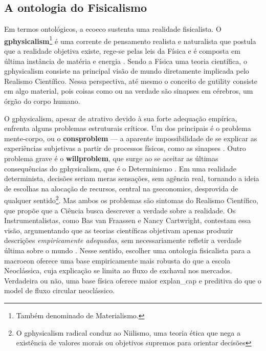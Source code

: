 \documentclass[./main.tex]{subfiles}
\begin{document}
\subsection{A ontologia do Fisicalismo} \label{subsec:physicalism}

\par Em termos ontológicos, a \gls{ecoeco} sustenta uma realidade fisicalista. O \textbf{\gls{gphysicalism}}\footnote{Também denominado de Materialismo.} é uma corrente de pensamento realista e naturalista que postula que a realidade objetiva existe, rege-se pelas leis da Física e é composta em última instância de matéria e energia \cite{sep-physicalism}. Sendo a Física uma \gls{teoria} científica, o \gls{gphysicalism} consiste na principal visão de mundo diretamente implicada pelo Realismo Científico. Nessa perspectiva, até mesmo o conceito de \gls{gutility} consiste em algo material, pois coisas como  ou  na verdade são sinapses em cérebros, um órgão do corpo humano. 

\par O \gls{gphysicalism}, apesar de atrativo devido à sua forte adequação empírica, enfrenta alguns problemas estruturais críticos. Um dos principais é o problema mente-corpo, ou o \textbf{\gls{consproblem}} — a aparente impossibilidade de se explicar as experiências subjetivas a partir de processos físicos, como as sinapses \cite{sep-consciousness}. Outro problema grave é o \textbf{\gls{willproblem}}, que surge ao se aceitar as últimas consequências do \gls{gphysicalism}, que é o Determinismo \cite{sep-skepticism}. Em uma realidade determinista, decisões seriam meras sensações, sem agência real, tornando a ideia de escolhas na alocação de recursos, central na \gls{gseconomics}, desprovida de qualquer sentido\footnote{O \gls{gphysicalism} radical conduz ao Niilismo, uma \gls{teoria} ética que nega a existência de valores morais ou objetivos supremos para orientar decisões}. Mas ambos os problemas são sintomas do Realismo Científico, que propõe que a Ciência busca descrever a verdade sobre a realidade. Os Instrumentalistas, como Bas van Fraassen e Nancy Cartwright, contestam essa visão, argumentando que as teorias científicas objetivam apenas produzir descrições \textit{empiricamente adequadas}, sem necessariamente refletir a verdade última sobre o mundo \cite{bas1980, nancy1983}. Nesse sentido, escolher uma ontologia fisicalista para a \gls{macroeon} oferece uma base empiricamente mais robusta do que a escola Neoclássica, cuja explicação se limita ao fluxo de \gls{exchaval} nos mercados. Verdadeira ou não, uma base física oferece maior \gls{explan_cap} e preditiva do que o \gls{model} de fluxo circular neoclássico.
\end{document}
